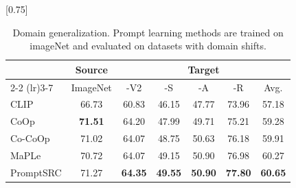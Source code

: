 \begin{table}[!t]

    \small \centering
 \setlength{\tabcolsep}{8pt}
    \scalebox{0.75}[0.75]{
    \begin{tabular}{l cccccc}
    \toprule
    & \textbf{Source} & \multicolumn{5}{c}{\textbf{Target}} \\ \cmidrule(lr){2-2} \cmidrule(lr){3-7}
     & ImageNet & -V2 & -S & -A & -R  & Avg.\\
    \midrule
    CLIP &  66.73 & 60.83 & {46.15} & 47.77 & {73.96} & {57.18} \\
    CoOp &  \textbf{71.51} & {64.20} & 47.99  & 49.71  & 75.21  & {59.28} \\
    Co-CoOp & 71.02 & {64.07} & 48.75 & 50.63 & 76.18 & {59.91}  \\
        MaPLe & 70.72  & {64.07} & 49.15  & 50.90 & 76.98 & {60.27}  \\
    \midrule
    \rowcolor{tabhighlight} PromptSRC & 71.27 & \textbf{{64.35}} & \textbf{49.55} & \textbf{50.90}  & \textbf{77.80} & \textbf{60.65} \\
    \bottomrule
    \end{tabular}}\vspace{-0.5em}
        \caption{\textnormal{Domain generalization. }Prompt learning methods are trained on imageNet and evaluated on datasets with domain shifts.} 
    \label{tab:robustness}
    \vspace{-1em}
\end{table}